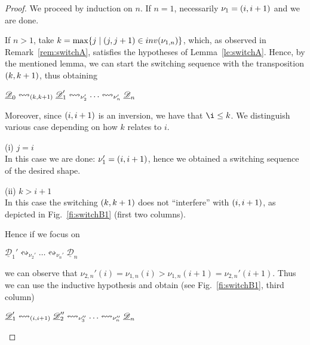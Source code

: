 \documentclass[a4paper,UKenglish,cleveref,pdftex,thm-restate,numberwithinsect]{lipics-v2021}
\newcommand{\dder}[1]{\mathscr{#1}}
\newcommand{\der}[1]{\underline{\dder{#1}}}
\newcommand{\inv}[1]{\mathsf{inv}({#1})}
\newcommand{\shift}[1]{\ensuremath{\mathrel{{\leftrightsquigarrow}_{#1}}}}
\begin{document}
\begin{proof}
  We proceed by induction on $n$. If $n=1$, necessarily
  $\nu_1 =  \transp{i}$ and we are done.

  If $n>1$, take $k = \max \{j \mid \transp{j} \in \inv{\nu_{1,n}}\}$, which,
  as observed in Remark~\ref{rem:switchA}, satisfies the hypotheses of
  Lemma~\ref{le:switchA}. Hence, by the mentioned lemma, we can start
  the switching sequence with the transposition $\transp{k}$, thus
  obtaining
  \begin{center}
    $\der{D}_0 \shift{\transp{k}} \der{D}_1' \shift{\nu_2'} \ldots
    \shift{\nu_n'} \der{D}_n$
  \end{center}

  Moreover, since $\transp{i}$ is an inversion, we have that
  $\i \leq k$.  We distinguish various case depending on how $k$
  relates to $i$.

  \bigskip
  \noindent
  (i) $j=i$\\
  In this case we are done: $\nu_1' = \transp{i}$, hence we obtained a
  switching sequence of the desired shape.

  \bigskip
  \noindent
  (ii) $k > i+1$\\
  In this case the switching $\transp{k}$ does not ``interfere'' with
  $\transp{i}$, as depicted in Fig.~\ref{fi:switchB1} (first two
  columns).

  Hence if we focus on
  \begin{center}
    $\der{D}_1' \shift{\nu_2'} \ldots
    \shift{\nu_n'} \der{D}_n$
  \end{center}
  we can observe that
  $\nu_{2,n}'(i)=\nu_{1,n}(i) > \nu_{1,n}(i+1)=\nu_{2,n}'(i+1)$.
  Thus we can use the inductive hypothesis and obtain (see
  Fig.~\ref{fi:switchB1}, third column)
  \begin{center}
    $\der{D}_1' \shift{\transp{i}} \der{D}_2'' \shift{\nu_3''} \ldots
    \shift{\nu_n''} \der{D}_n$
  \end{center}

\begin{figure}
  \centering
\end{figure}
\end{proof}
\end{document}
